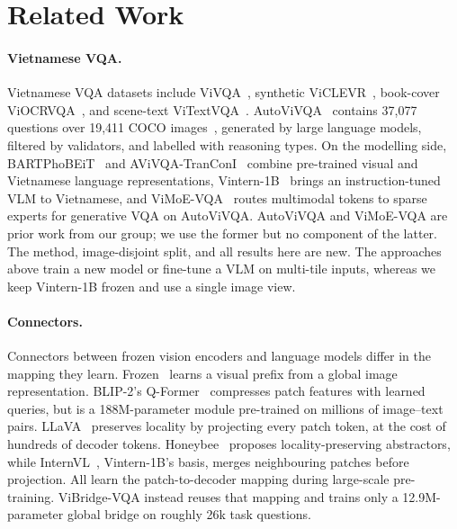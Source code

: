 \section{Related Work}
\label{sec:related}

\paragraph{Vietnamese VQA.}
Vietnamese VQA datasets include ViVQA~\cite{tran2021vivqa}, synthetic
ViCLEVR~\cite{tran2023viclevr}, book-cover ViOCRVQA~\cite{pham2024viocrvqa}, and scene-text
ViTextVQA~\cite{nguyen2025vitextvqa}. AutoViVQA~\cite{autovivqa2026} contains 37{,}077 questions
over 19{,}411 COCO images~\cite{lin2015coco}, generated by large language models, filtered by
validators, and labelled with reasoning types. On the modelling side,
BARTPhoBEiT~\cite{tran2023bartphobeitpretrainedsequencetosequenceimage} and
AViVQA-TranConI~\cite{nguyen2024tranconi} combine pre-trained visual and Vietnamese language
representations, Vintern-1B~\cite{doan2024vintern1b} brings an instruction-tuned VLM to
Vietnamese, and ViMoE-VQA~\cite{vimoevqa} routes multimodal tokens to sparse experts for
generative VQA on AutoViVQA. AutoViVQA and ViMoE-VQA are prior work from our group; we use the
former but no component of the latter. The method, image-disjoint split, and all results here are
new. The approaches above train a new model or fine-tune a VLM on multi-tile inputs,
whereas we keep Vintern-1B frozen and use a single image view.

\paragraph{Connectors.}
Connectors between frozen vision encoders and language models differ in the mapping they learn.
Frozen~\cite{tsimpoukelli2021frozen} learns a visual prefix from a global image representation.
BLIP-2's Q-Former~\cite{li2023blip2} compresses patch features with learned queries, but is a
188M-parameter module pre-trained on millions of image--text pairs.
LLaVA~\cite{liu2023visualinstructiontuning,liu2024llava15} preserves locality by projecting every
patch token, at the cost of hundreds of decoder tokens. Honeybee~\cite{cha2024honeybee} proposes
locality-preserving abstractors, while InternVL~\cite{chen2024internvl15,chen2024internvl}, Vintern-1B's basis,
merges neighbouring patches before projection. All learn the patch-to-decoder mapping during
large-scale pre-training. ViBridge-VQA instead reuses that mapping and trains only a 12.9M-parameter
global bridge on roughly 26k task questions.


